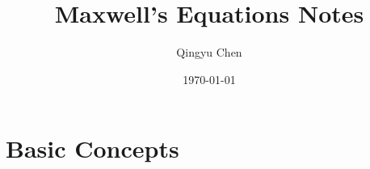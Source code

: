 \documentclass{article}
\title{Maxwell's Equations Notes}
\author{Qingyu Chen}
\date{\today}
\begin{document}
	\large
	\setlength{\baselineskip}{2em}
	
	\renewcommand{\d}[1][x]{\ \text{d}#1}
	
	\newcommand{\Time}{t}
	\newcommand{\Line}{L}
	\newcommand{\Surface}{S}
	
	\newcommand{\opDivergence}{\nabla \cdot}
	\newcommand{\opCurl}{\nabla \times}
	
	\newcommand{\ElectricCharge}{Q}
	\newcommand{\ElectricChargeDensity}{\rho_E}
	\newcommand{\MagneticChargeDensity}{\rho_M}
	\newcommand{\ElectricCurrent}{I}
	\newcommand{\ElectricCurrentDensity}{\vec{J}_E}
	\newcommand{\MagneticCurrentDensity}{\vec{J}_M}
	\newcommand{\ElectricField}{\vec{E}}
	\newcommand{\MagneticField}{\vec{H}}
	\newcommand{\ElectricFluxDensity}{\vec{D}}
	\newcommand{\MagneticFluxDensity}{\vec{B}}
	
	\newcommand{\Permittivity}{\varepsilon}
	\newcommand{\Permeability}{\mu}
	\newcommand{\Conductivity}{\sigma}
	
	\maketitle
	
	\tableofcontents
	
	\newpage
	
	\section{Basic Concepts}
	
\end{document}

